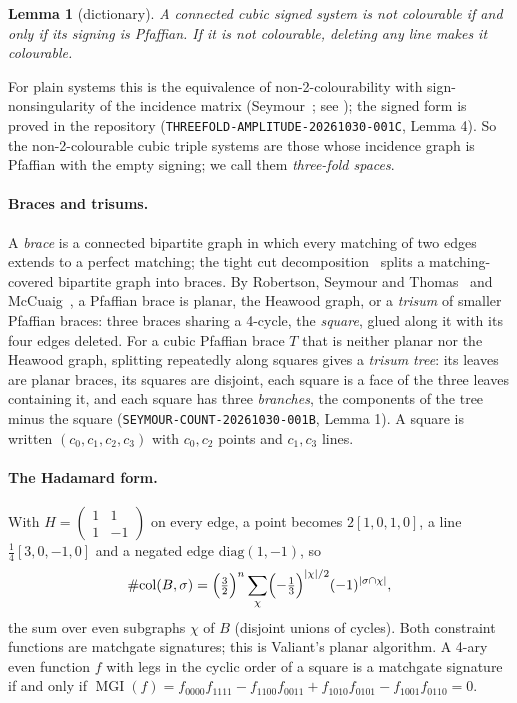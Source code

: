 \documentclass[11pt]{article}
\newtheorem{lemma}[theorem]{Lemma}
\theoremstyle{definition}
\theoremstyle{remark}
\newcommand{\col}{\#\mathrm{col}}
\newcommand{\MGI}{\operatorname{MGI}}
\begin{document}
\begin{lemma}[dictionary]\label{lem:dict}
A connected cubic signed system is not colourable if and only if its signing
is Pfaffian. If it is not colourable, deleting any line makes it colourable.
\end{lemma}
For plain systems this is the equivalence of non-2-colourability with
sign-nonsingularity of the incidence matrix (Seymour~\cite{Sey74}; see
\cite[Sect.~1]{RST99}); the signed form is proved in the repository
(\texttt{THREEFOLD-AMPLITUDE-20261030-001C}, Lemma 4). So the non-2-colourable
cubic triple systems are those whose incidence graph is Pfaffian with the
empty signing; we call them \emph{three-fold spaces}.

\paragraph{Braces and trisums.} A \emph{brace} is a connected bipartite graph
in which every matching of two edges extends to a perfect matching; the tight
cut decomposition~\cite{ELP82,LP86} splits a matching-covered bipartite graph
into braces. By Robertson, Seymour and Thomas~\cite{RST99} and
McCuaig~\cite{McC04}, a Pfaffian brace is planar, the Heawood graph, or a
\emph{trisum} of smaller Pfaffian braces: three braces sharing a 4-cycle, the
\emph{square}, glued along it with its four edges deleted. For a cubic
Pfaffian brace $T$ that is neither planar nor the Heawood graph, splitting
repeatedly along squares gives a \emph{trisum tree}: its leaves are planar
braces, its squares are disjoint, each square is a face of the three leaves
containing it, and each square has three \emph{branches}, the components of
the tree minus the square (\texttt{SEYMOUR-COUNT-20261030-001B}, Lemma 1).
A square is written $(c_0,c_1,c_2,c_3)$ with $c_0,c_2$ points and $c_1,c_3$
lines.

\paragraph{The Hadamard form.} With $H=\begin{pmatrix}1&1\\1&-1\end{pmatrix}$
on every edge, a point becomes $2[1,0,1,0]$, a line
$\tfrac14[3,0,-1,0]$ and a negated edge $\mathrm{diag}(1,-1)$, so
\begin{equation}\label{eq:hadamard}
\col(B,\sigma)=\Bigl(\tfrac32\Bigr)^{n}\sum_{\chi}\Bigl(-\tfrac13\Bigr)^{|\chi|/2}(-1)^{|\sigma\cap\chi|},
\end{equation}
the sum over even subgraphs $\chi$ of $B$ (disjoint unions of cycles). Both
constraint functions are matchgate signatures; this is Valiant's planar
algorithm. A 4-ary even function $f$ with legs in the cyclic order of a square
is a matchgate signature if and only if
$\MGI(f)=f_{0000}f_{1111}-f_{1100}f_{0011}+f_{1010}f_{0101}-f_{1001}f_{0110}=0$.
\end{document}
